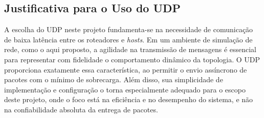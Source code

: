 \documentclass[12pt,a4paper]{report}
\begin{document}
\subsection*{Justificativa para o Uso do UDP}

A escolha do UDP neste projeto fundamenta-se na necessidade de comunicação de baixa latência entre os roteadores e \textit{hosts}. Em um ambiente de simulação de rede, como o aqui proposto, a agilidade na transmissão de mensagens é essencial para representar com fidelidade o comportamento dinâmico da topologia. O UDP proporciona exatamente essa característica, ao permitir o envio assíncrono de pacotes com o mínimo de sobrecarga. Além disso, sua simplicidade de implementação e configuração o torna especialmente adequado para o escopo deste projeto, onde o foco está na eficiência e no desempenho do sistema, e não na confiabilidade absoluta da entrega de pacotes.



\end{document}

